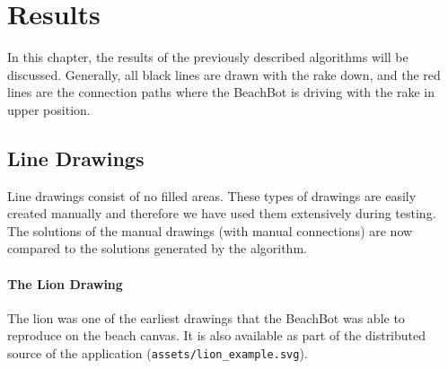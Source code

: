 \chapter{Results}

In this chapter, the results of the previously described algorithms will be discussed. Generally, all black lines are drawn with the rake down, and the red lines are the connection paths where the BeachBot is driving with the rake in upper position.

\section{Line Drawings}

Line drawings consist of no filled areas. These types of drawings are easily created manually and therefore we have used them extensively during testing. The solutions of the manual drawings (with manual connections) are now compared to the solutions generated by the algorithm.

\subsubsection{The Lion Drawing}

The lion was one of the earliest drawings that the BeachBot was able to reproduce on the beach canvas. It is also available as part of the distributed source of the application (\texttt{assets/lion\_example.svg}).

